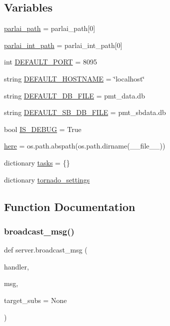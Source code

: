 \subsection*{Variables}
\begin{DoxyCompactItemize}
\item 
\hyperlink{namespaceserver_abd4781cfa228e5322b9a3dad522e4b17}{parlai\+\_\+path} = parlai\+\_\+path\mbox{[}0\mbox{]}
\item 
\hyperlink{namespaceserver_a74bacf9786854a2e0d38291f46a4f0a5}{parlai\+\_\+int\+\_\+path} = parlai\+\_\+int\+\_\+path\mbox{[}0\mbox{]}
\item 
int \hyperlink{namespaceserver_a799b32fdd2321df0f6d93809c1aca14a}{D\+E\+F\+A\+U\+L\+T\+\_\+\+P\+O\+RT} = 8095
\item 
string \hyperlink{namespaceserver_a0ea5dfe17186557ed34035da16619aa6}{D\+E\+F\+A\+U\+L\+T\+\_\+\+H\+O\+S\+T\+N\+A\+ME} = \char`\"{}localhost\char`\"{}
\item 
string \hyperlink{namespaceserver_a4d969e2880bb5b39591808aa7992ba7f}{D\+E\+F\+A\+U\+L\+T\+\_\+\+D\+B\+\_\+\+F\+I\+LE} = \textquotesingle{}pmt\+\_\+data.\+db\textquotesingle{}
\item 
string \hyperlink{namespaceserver_a0353dec6c16b5c818b9250723ced65b9}{D\+E\+F\+A\+U\+L\+T\+\_\+\+S\+B\+\_\+\+D\+B\+\_\+\+F\+I\+LE} = \textquotesingle{}pmt\+\_\+sbdata.\+db\textquotesingle{}
\item 
bool \hyperlink{namespaceserver_a4da0f891642a0631c5baf8dec244ef4a}{I\+S\+\_\+\+D\+E\+B\+UG} = True
\item 
\hyperlink{namespaceserver_a3ed884cbe61302d8889e5f7495bb60e4}{here} = os.\+path.\+abspath(os.\+path.\+dirname(\+\_\+\+\_\+file\+\_\+\+\_\+))
\item 
dictionary \hyperlink{namespaceserver_a847ccf0f415507e9b016ec8b9239669c}{tasks} = \{\}
\item 
dictionary \hyperlink{namespaceserver_a3c637d57121d469c84c0f13a6fe3722b}{tornado\+\_\+settings}
\end{DoxyCompactItemize}


\subsection{Function Documentation}
\mbox{\label{namespaceserver_adf70e1f9b13f82a360769a9ce6e3333c}} 
\subsubsection{\texorpdfstring{broadcast\+\_\+msg()}{broadcast\_msg()}}
{\footnotesize\ttfamily def server.\+broadcast\+\_\+msg (\begin{DoxyParamCaption}\item[{}]{handler,  }\item[{}]{msg,  }\item[{}]{target\+\_\+subs = {\ttfamily None} }\end{DoxyParamCaption})}



